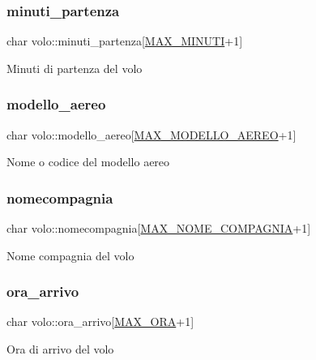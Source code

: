 \subsubsection{\texorpdfstring{minuti\+\_\+partenza}{minuti\_partenza}}
{\footnotesize\ttfamily char volo\+::minuti\+\_\+partenza\mbox{[}\hyperlink{define_8h_ac5b85a4e0fdb0ecb53800fca4922a22a}{M\+A\+X\+\_\+\+M\+I\+N\+U\+TI}+1\mbox{]}}

Minuti di partenza del volo \mbox{\label{structvolo_aef48b36293706e7c28985152b5c0a603}} 
\subsubsection{\texorpdfstring{modello\+\_\+aereo}{modello\_aereo}}
{\footnotesize\ttfamily char volo\+::modello\+\_\+aereo\mbox{[}\hyperlink{define_8h_ab684e2c8b65a24a7e59c9ff4b02bfd02}{M\+A\+X\+\_\+\+M\+O\+D\+E\+L\+L\+O\+\_\+\+A\+E\+R\+EO}+1\mbox{]}}

Nome o codice del modello aereo \mbox{\label{structvolo_a3de88fe76ccd1e5411d940065e822316}} 
\subsubsection{\texorpdfstring{nomecompagnia}{nomecompagnia}}
{\footnotesize\ttfamily char volo\+::nomecompagnia\mbox{[}\hyperlink{define_8h_a7d6eb3284e80ca7fa5346973e751a273}{M\+A\+X\+\_\+\+N\+O\+M\+E\+\_\+\+C\+O\+M\+P\+A\+G\+N\+IA}+1\mbox{]}}

Nome compagnia del volo \mbox{\label{structvolo_abf76dd17ffe6c732d6a00196a66caefb}} 
\subsubsection{\texorpdfstring{ora\+\_\+arrivo}{ora\_arrivo}}
{\footnotesize\ttfamily char volo\+::ora\+\_\+arrivo\mbox{[}\hyperlink{define_8h_a0e20e0c8264b18234ee1c3f1eb4943f0}{M\+A\+X\+\_\+\+O\+RA}+1\mbox{]}}

Ora di arrivo del volo \mbox{\label{structvolo_abeb76dfa2a22679f546c1d83d74c16e4}} 

